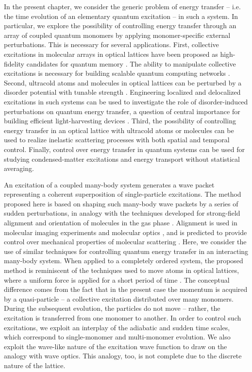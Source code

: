 In the present chapter, we consider the generic problem of energy transfer -- i.e. the time evolution of an elementary  
quantum excitation -- in such a system. In particular, we explore the possibility of controlling energy transfer through
 an array of coupled quantum monomers by applying monomer-specific external perturbations. This is necessary for 
several applications. First, collective excitations in molecular arrays in optical lattices have been proposed as 
high-fidelity candidates for quantum memory \cite{peter-rabl, peter-rabl2}.  The ability to manipulate collective excitations is necessary
 for building scalable quantum computing networks \cite{quantum-computing}. 
Second, ultracold atoms and 
molecules in optical lattices can be perturbed by a disorder potential with tunable strength 
\cite{anderson-localization-of-ultracold-atoms}. Engineering localized and delocalized excitations in such systems 
can be used to investigate the role of disorder-induced perturbations  on quantum energy transfer, a question of
 central importance for building efficient light-harvesting devices \cite{solar-cell}.
 Third, the possibility of controlling energy transfer in an optical lattice with ultracold atoms or molecules can
 be used to realize inelastic scattering processes with both spatial and temporal control. Finally, control over energy
transfer in quantum systems can be used for studying condensed-matter excitations and energy transport without 
statistical averaging.

An excitation of a coupled many-body system generates a wave packet representing a coherent superposition of 
single-particle excitations. The method proposed here is based on shaping such many-body wave packets by a series
 of sudden perturbations, in analogy with the techniques developed for strong-field alignment and orientation of 
molecules in the gas phase \cite{alignment-review}. Alignment is used in molecular imaging experiments and
 molecular optics \cite{alignment-review, imaging1, imaging2, imaging3}, and is predicted to provide control over 
mechanical properties of molecular scattering \cite{averbukh-AlignedInteractions, averbukh-AlignedInteractions2}. 
Here, we consider the use of similar techniques for controlling quantum energy transfer in an  interacting
 many-body system.
 When applied to a completely ordered system, the proposed method is reminiscent of the techniques used to 
move atoms in optical lattices, where a uniform force is applied for a short period of time \cite{denschlag2002}. 
The conceptual difference comes from the fact that in the present case the momentum is acquired by a 
quasi-particle -- a collective excitation distributed over many monomers. During the subsequent evolution, 
the particles do not move -- rather, the excitation is transferred from one monomer to another. In order to control
 such excitations, we exploit an interplay of the adiabatic and sudden time scales, which correspond to
 single-monomer and multi-monomer evolution. We also exploit the wave-like nature of the excitation wave function
 to draw on the analogy with wave optics. This analogy, too, is not complete due to the discrete nature of the lattice.

